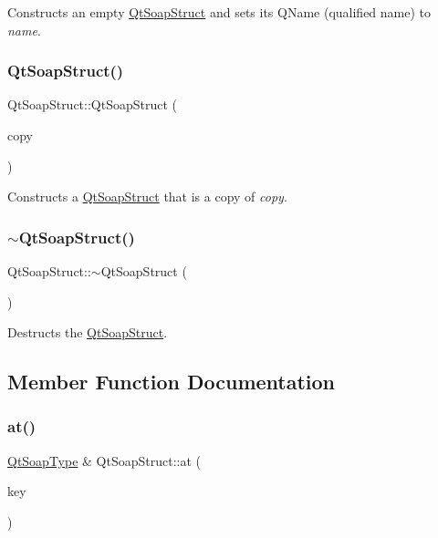 Constructs an empty \mbox{\hyperlink{class_qt_soap_struct}{Qt\+Soap\+Struct}} and sets its Q\+Name (qualified name) to {\itshape name}. \mbox{\label{class_qt_soap_struct_a366fb6931d27c7f3cde07c00a3c40e05}} 
\subsubsection{\texorpdfstring{Qt\+Soap\+Struct()}{QtSoapStruct()}\hspace{0.1cm}{\footnotesize\ttfamily [3/3]}}
{\footnotesize\ttfamily Qt\+Soap\+Struct\+::\+Qt\+Soap\+Struct (\begin{DoxyParamCaption}\item[{const \mbox{\hyperlink{class_qt_soap_struct}{Qt\+Soap\+Struct}} \&}]{copy }\end{DoxyParamCaption})}

Constructs a \mbox{\hyperlink{class_qt_soap_struct}{Qt\+Soap\+Struct}} that is a copy of {\itshape copy}. \mbox{\label{class_qt_soap_struct_a3b8c2a12ec49a2f96cf90b053c186d73}} 
\subsubsection{\texorpdfstring{$\sim$\+Qt\+Soap\+Struct()}{~QtSoapStruct()}}
{\footnotesize\ttfamily Qt\+Soap\+Struct\+::$\sim$\+Qt\+Soap\+Struct (\begin{DoxyParamCaption}{ }\end{DoxyParamCaption})}

Destructs the \mbox{\hyperlink{class_qt_soap_struct}{Qt\+Soap\+Struct}}. 

\subsection{Member Function Documentation}
\mbox{\label{class_qt_soap_struct_a62d5abf450b25ec149779b0ac3e592ef}} 
\subsubsection{\texorpdfstring{at()}{at()}\hspace{0.1cm}{\footnotesize\ttfamily [1/2]}}
{\footnotesize\ttfamily \mbox{\hyperlink{class_qt_soap_type}{Qt\+Soap\+Type}} \& Qt\+Soap\+Struct\+::at (\begin{DoxyParamCaption}\item[{const \mbox{\hyperlink{class_qt_soap_q_name}{Qt\+Soap\+Q\+Name}} \&}]{key }\end{DoxyParamCaption})}

